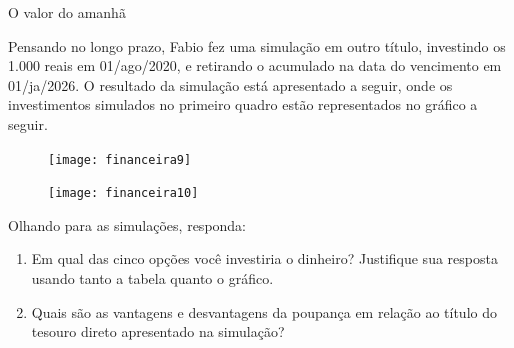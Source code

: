 \clearpage
\begin{task}{O valor do amanhã}
\label{fin-ativ-16}

Pensando no longo prazo, Fabio fez uma simulação em outro título, investindo os 1.000 reais em 01/ago/2020, e retirando o acumulado na data do vencimento em 01/ja/2026. O resultado da simulação está apresentado a seguir, onde os investimentos simulados no primeiro quadro estão representados no gráfico a seguir.

\begin{figure}[H]
\centering

\texttt{[image: financeira9]}

\texttt{[image: financeira10]}
\end{figure}

Olhando para as simulações, responda:
\begin{enumerate}
  \item Em qual das cinco opções você investiria o dinheiro? Justifique sua resposta usando tanto a tabela quanto o gráfico.
  \item Quais são as vantagens e desvantagens da poupança em relação ao título do tesouro direto apresentado na simulação?
\end{enumerate}
\end{task}


